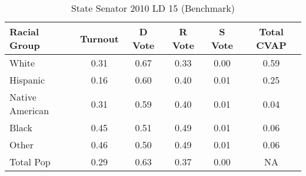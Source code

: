 \begin{table}[htb]
\begin{center}
\caption{State Senator 2010 LD 15 (Benchmark)}
\label{stsen10_cvap_ld_15_benchmark}
\begin{tabular}{lccccc}
  \hline
Racial Group & Turnout & D Vote & R Vote & S Vote & Total CVAP \\ 
  \hline
White & 0.31  & 0.67  & 0.33  & 0.00  & 0.59 \\
    Hispanic & 0.16  & 0.60  & 0.40  & 0.01  & 0.25 \\
    Native American & 0.31  & 0.59  & 0.40  & 0.01  & 0.04 \\
    Black & 0.45  & 0.51  & 0.49  & 0.01  & 0.06 \\
    Other & 0.46  & 0.50  & 0.49  & 0.01  & 0.06 \\
    Total Pop & 0.29  & 0.63  & 0.37  & 0.00  & NA \\
    
   \hline
\end{tabular}
\end{center}
\end{table}